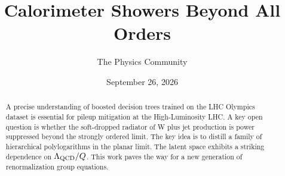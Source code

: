 \documentclass[11pt]{article}
\title{Calorimeter Showers Beyond All Orders}
\author{The Physics Community}
\date{September 26, 2026}
\numberwithin{equation}{section}
\theoremstyle{definition}
\theoremstyle{remark}
\begin{document}
\maketitle
\begin{abstract}
A precise understanding of boosted decision trees trained on the LHC
Olympics dataset is essential for pileup mitigation at the
High-Luminosity LHC. A key open question is whether the soft-dropped
radiator of W plus jet production is power suppressed beyond the
strongly ordered limit. The key idea is to distill a family of
hierarchical polylogarithms in the planar limit. The latent space
exhibits a striking dependence on $\Lambda_{\rm QCD}/Q$. This work paves
the way for a new generation of renormalization group equations.
\end{abstract}
\tableofcontents



\nocite{*}


\end{document}
